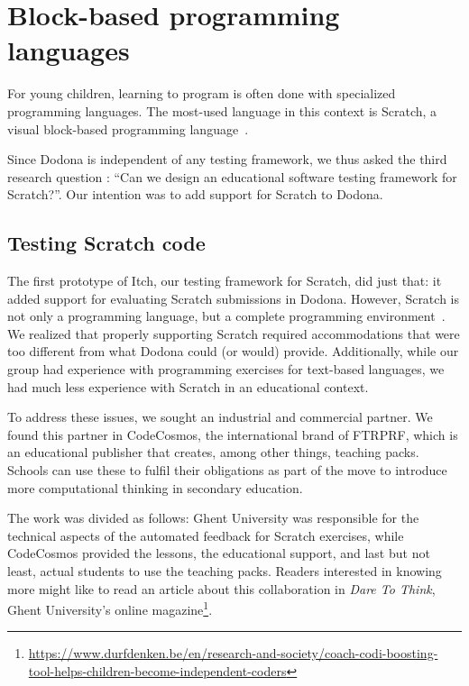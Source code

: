 \documentclass[../main]{subfiles}
\begin{document}
\section{Block-based programming languages}\label{sec:the-second-part:-scratch}

For young children, learning to program is often done with specialized programming languages.
The most-used language in this context is Scratch, a visual block-based programming language~\autocite{resnickScratchProgrammingAll2009}.

Since Dodona is independent of any testing framework, we thus asked the third research question : ``Can we design an educational software testing framework for Scratch?''.
Our intention was to add support for Scratch to Dodona.

\subsection{Testing Scratch code}\label{subsec:testing-scrath-code}

The first prototype of Itch, our testing framework for Scratch, did just that: it added support for evaluating Scratch submissions in Dodona.
However, Scratch is not only a programming language, but a complete programming environment~\autocite{maloneyScratchProgrammingLanguage2010}.
We realized that properly supporting Scratch required accommodations that were too different from what Dodona could (or would) provide.
Additionally, while our group had experience with programming exercises for text-based languages, we had much less experience with Scratch in an educational context.

To address these issues, we sought an industrial and commercial partner.
We found this partner in CodeCosmos, the international brand of FTRPRF, which is an educational publisher that creates, among other things, teaching packs.
Schools can use these to fulfil their obligations as part of the move to introduce more computational thinking in secondary education.

The work was divided as follows: Ghent University was responsible for the technical aspects of the automated feedback for Scratch exercises, while CodeCosmos provided the lessons, the educational support, and last but not least, actual students to use the teaching packs.
Readers interested in knowing more might like to read an article about this collaboration in \textit{Dare To Think}, Ghent University's online magazine\footnote{\url{https://www.durfdenken.be/en/research-and-society/coach-codi-boosting-tool-helps-children-become-independent-coders}}.
\end{document}

